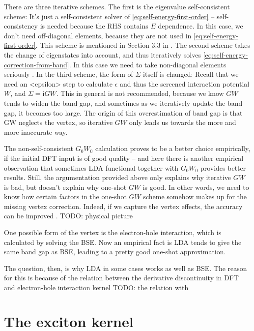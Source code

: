 \documentclass[hyperref, a4paper, 12pt]{report}
\newcommand*{\ii}{\mathrm{i}}
\def\texttt#1{<#1>}%
\newcommand{\shortcode}[1]{\texttt{#1}}
\begin{document}
There are three iterative schemes.
The first is the eigenvalue self-consistent scheme:
It's just a self-consistent solver of \eqref{eq:self-energy-first-order}
-- self-consistency is needed 
because the RHS contains $E$ dependence.
In this case, we don't need off-diagonal elements,
because they are not used in \eqref{eq:self-energy-first-order}.
This scheme is mentioned in Section 3.3 in \cite{berkeleygw}.
The second scheme takes the change of eigenstates into account,
and thus iteratively solves \eqref{eq:self-energy-correction-from-band}.
In this case we need to take non-diagonal elements seriously \cite{faleev2004all,aguilera2013g}.
In the third scheme, the form of $\Sigma$ itself is changed:
Recall that we need an \shortcode{epsilon} step to calculate $\epsilon$ 
and thus the screened interaction potential $W$, 
and $\Sigma = \ii G W$. 
This in general is not recommended,
because we know $GW$ tends to widen the band gap,
and sometimes as we iteratively update the band gap,
it becomes too large.
The origin of this overestimation of band gap is 
that GW neglects the vertex,
so iterative $GW$ only leads us towards the more and more inaccurate way. 

The non-self-consistent $G_0 W_0$ calculation proves to be a better choice empirically,
if the initial DFT input is of good quality -- 
and here there is another empirical observation that 
sometimes LDA functional together with $G_0 W_0$ provides better results.
Still, the argumentation provided above only explains why iterative $GW$ is bad, 
but doesn't explain why one-shot $GW$ is good. 
In other words, we need to know how certain factors 
in the one-shot $GW$ scheme somehow makes up for 
the missing vertex correction.
Indeed, if we capture the vertex effects, 
the accuracy can be improved 
\cite{PhysRevLett.99.246403}.
TODO: physical picture

One possible form of the vertex is the electron-hole interaction, which is calculated by solving the BSE. 
Now an empirical fact is  
LDA tends to give the same band gap as BSE, 
leading to a pretty good one-shot approximation. 

The question, then, is why LDA in some cases works as well as BSE.
The reason for this is because of the relation between the derivative discontinuity in DFT and electron-hole interaction kernel
TODO: the relation with \cite{perdew1982density}

\section{The exciton kernel} 
\end{document}
